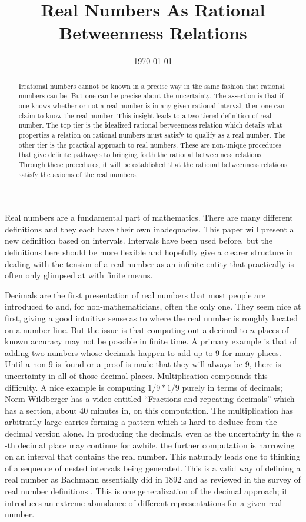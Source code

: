 \documentclass[12pt]{article}
\title{Real Numbers As Rational Betweenness Relations}
\date{\today}
\begin{document}
\maketitle
\begin{abstract}
Irrational numbers cannot be known in a precise way in the same fashion that rational numbers can be. But one can be precise about the uncertainty. The assertion is that if one knows whether or not a real number is in any given rational interval, then one can claim to know the real number. This insight leads to a two tiered definition of real number. The top tier is the idealized rational betweenness relation which details what properties a relation on rational numbers must satisfy to qualify as a real number. The other tier is the practical approach to real numbers. These are non-unique procedures that give definite pathways to bringing forth the rational betweenness relations. Through these procedures, it will be established that the rational betweenness relations satisfy the axioms of the real numbers. 
\end{abstract}

Real numbers are a fundamental part of mathematics. There are many different definitions and they each have their own inadequacies. This paper will present a new definition based on intervals. Intervals have been used before, but the definitions here should be more flexible and hopefully give a clearer structure in dealing with the tension of a real number as an infinite entity that practically is often only glimpsed at with finite means. 

Decimals are the first presentation of real numbers that most people are introduced to and, for non-mathematicians, often the only one. They seem nice at first, giving a good intuitive sense as to where the real number is roughly located on a number line. But the issue is that computing out a decimal to $n$ places of known accuracy may not be possible in finite time. A primary example is that of adding two numbers whose decimals happen to add up to 9 for many places. Until a non-9 is found or a proof is made that they will always be 9, there is uncertainty in all of those decimal places. Multiplication compounds this difficulty. A nice example is computing $1/9 * 1/9$ purely in terms of decimals; Norm Wildberger has a video entitled ``Fractions and repeating decimals'' which has a section, about 40 minutes in, on this computation. The multiplication has arbitrarily large carries forming a pattern which is hard to deduce from the decimal version alone. In producing the decimals, even as the uncertainty in the $n$-th decimal place may continue for awhile, the further computation is narrowing on an interval that contains the real number. This naturally leads one to thinking of a sequence of nested intervals being generated. This is a valid way of defining a real number as Bachmann essentially did in 1892 and as reviewed in the survey of real number definitions \cite{ittay-2015}. This is one generalization of the decimal approach; it introduces an extreme abundance of different representations for a given real number. 
\end{document}
